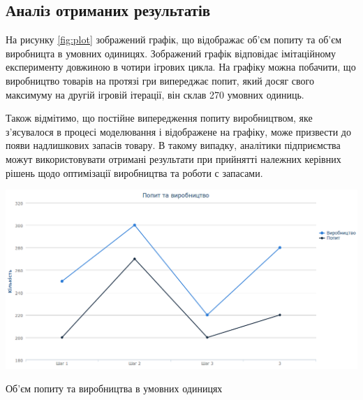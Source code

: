 \subsection{Аналіз отриманих результатів}

На рисунку \ref{fig:plot} зображений графік, що відображає об’єм попиту та об’єм виробницта в умовних одиницях. Зображений графік відповідає імітаційному експерименту довжиною в чотири ігрових цикла. На графіку можна побачити, що виробництво товарів на протязі гри випереджає попит, який досяг свого максимуму на другій ігровій ітерації, він склав 270 умовних одиниць. 

Також відмітимо, що постійне випередження попиту виробництвом, яке з’ясувалося в процесі моделювання і відображене на графіку, може призвести до появи надлишкових запасів товару. В такому випадку, аналітики підприємства можут використовувати отримані результати при прийнятті належних керівних рішень щодо оптимізації виробництва та роботи с запасами.

\begin{stdfigure}
    \includegraphics[width=7in]{images/plot.png}
    \caption{Об’єм попиту та виробництва в умовних одиницях}
    \label{fig:plot}
\end{stdfigure}

